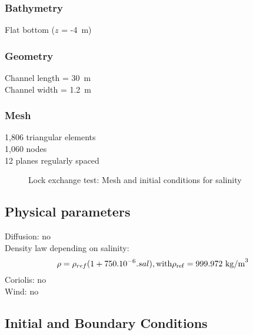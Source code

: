 \subsubsection{Bathymetry}
%
Flat bottom ($z$ = -4~m)
%
\subsubsection{Geometry}
%
Channel length = 30~m\\
Channel width = 1.2~m
%
\subsubsection{Mesh}
%
1,806 triangular elements\\
1,060 nodes\\
12 planes regularly spaced
%
\begin{figure} [H]
\centering
{}
 \caption{Lock exchange test: Mesh and initial conditions for salinity}
 \label{t3d:lock-exchange:mesh_CI}
\end{figure}
%
%
%
\subsection{Physical parameters}
%
Diffusion: no\\
Density law depending on salinity:
\begin{equation}
\rho = \rho_{ref} (1 + 750.10^{-6} . sal ),
\rm{with } \rho_{ref} = 999.972~\rm{kg/m}^3
\end{equation}
Coriolis: no\\
Wind: no
%
%
%
%
%
%
\subsection{Initial and Boundary Conditions}
%
